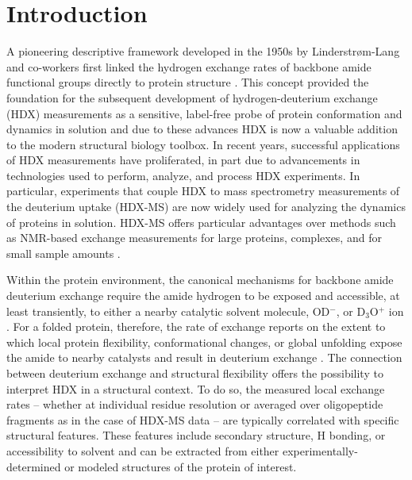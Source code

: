 \documentclass[9pt,tutorial,ASAPversion]{livecoms}
\begin{document}
\section{Introduction}
A pioneering descriptive framework developed in the 1950s by Linderstrøm-Lang and co-workers first linked the hydrogen exchange rates of backbone amide functional groups directly to protein structure  \cite{Hvidt1954, Englander1997}. 
This concept provided the foundation for the subsequent development of hydrogen-deuterium exchange (HDX) measurements as a sensitive, label-free probe of protein conformation and dynamics in solution and due to these advances HDX is now a valuable addition to the modern structural biology toolbox. 
In recent years, successful applications of HDX measurements have proliferated, in part due to advancements in technologies used to perform, analyze, and process HDX experiments. 
In particular, experiments that couple HDX to mass spectrometry measurements of the deuterium uptake (HDX-MS) are now widely used for analyzing the dynamics of proteins in solution.
HDX-MS offers particular advantages over methods such as NMR-based exchange measurements for large proteins, complexes, and for small sample amounts \cite{Oganesyan2018, Engen2020, James2021}.

Within the protein environment, the canonical mechanisms for backbone amide deuterium exchange require the amide hydrogen to be exposed and accessible, at least transiently, to either a nearby catalytic solvent molecule, OD$^-$, or D$_3$O$^+$ ion \cite{Hvidt1966, Englander1983}. 
For a folded protein, therefore, the rate of exchange reports on the extent to which local protein flexibility, conformational changes, or global unfolding expose the amide to nearby catalysts and result in deuterium exchange \cite{Hvidt1966, Englander1997, Englander1983, Oganesyan2018}.
The connection between deuterium exchange and structural flexibility offers the possibility to interpret HDX in a structural context.
To do so, the measured local exchange rates -- whether at individual residue resolution or averaged over oligopeptide fragments as in the case of HDX-MS data -- are typically correlated with specific structural features. 
These features include secondary structure, H bonding, or accessibility to solvent and can be extracted from either experimentally-determined or modeled structures of the protein of interest.
\end{document}
